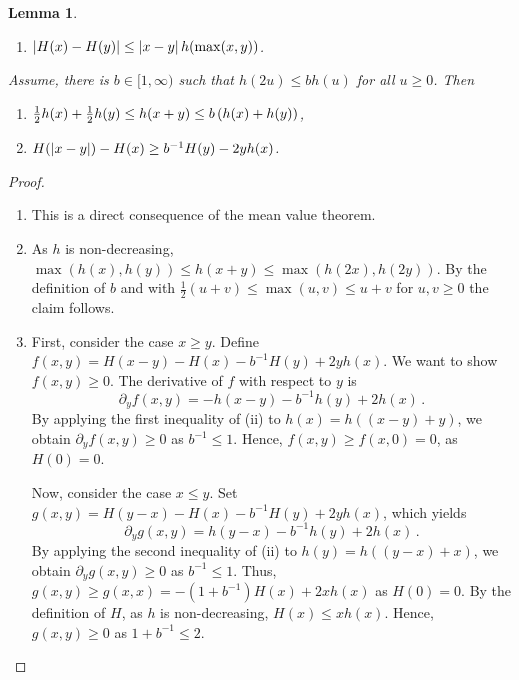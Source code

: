 \documentclass{scrartcl}
\newcommand{\equationFullstop}{\, .}
\newcommand{\eqfs}{\equationFullstop}
\theoremstyle{plain}\newtheorem{theorem}{Theorem}[section]
\newtheorem{lemma}[theorem]{Lemma}
\theoremstyle{definition}
\theoremstyle{remark}
\begin{document}
\begin{appendix}
\begin{lemma}
\begin{enumerate}[label=(\roman*)]
\item $\left| H(x) - H(y) \right| \leq \left| x-y \right|h(\max(x, y))$.
\end{enumerate}
Assume, there is $b \in [1,\infty)$ such that $h(2u) \leq b h(u)$ for all $u \geq 0$. Then
\begin{enumerate}[label=(\roman*),start=2]
\item $\frac12 h(x) + \frac12 h(y) \leq h (x+y) \leq b \left( h(x) + h(y) \right)$,
\item $H(\left| x-y \right|) - H(x) \geq b^{-1} H(y) - 2 y h(x)$.
\end{enumerate}
\end{lemma}
\begin{proof}
\begin{enumerate}[label=(\roman*)]
\item This is a direct consequence of the mean value theorem.
\item As $h$ is non-decreasing, $\max(h(x), h(y)) \leq h(x+y) \leq \max(h(2x), h(2y))$.
	By the definition of $b$ and with $\frac12(u+v) \leq \max(u,v) \leq u+v$ for $u,v \geq 0$ the claim follows.
\item 
	First, consider the case $x\geq y$.
 	Define $f(x,y) = H(x-y)-H(x)- b^{-1} H(y) + 2 y h(x)$.
 	We want to show $f(x, y)\geq0$.
	The derivative of $f$ with respect to $y$ is 
	\begin{equation*}
		\partial_y f(x, y) = -h(x-y) - b^{-1}h(y) + 2 h(x)\eqfs
	\end{equation*} 
	By applying the first inequality of (ii) to $h(x) = h((x-y) + y)$, we obtain $\partial_y f(x, y)  \geq 0$ as $b^{-1} \leq 1$.
	Hence, $f(x, y) \geq f(x, 0) = 0$, as $H(0) = 0$.
	
	Now, consider the case $x \leq y$. Set $g(x,y) = H(y-x) - H(x) - b^{-1} H(y) + 2 y h(x)$, which yields
	\begin{equation*}
		\partial_y g(x, y) = h(y-x) - b^{-1} h(y) + 2 h(x)\eqfs
	\end{equation*} 
	By applying the second inequality of (ii) to $h(y) = h((y-x) + x)$, we obtain $\partial_y g(x, y)  \geq 0$ as $b^{-1} \leq 1$.
	Thus, $g(x, y) \geq g(x, x) = -(1 + b^{-1}) H(x) + 2 x h(x)$ as $H(0) = 0$.
	By the definition of $H$, as $h$ is non-decreasing, $H(x) \leq x h(x)$. Hence, $g(x, y) \geq 0$ as $1 + b^{-1} \leq 2$.


\end{enumerate}
\end{proof}
\end{appendix}
\end{document}
